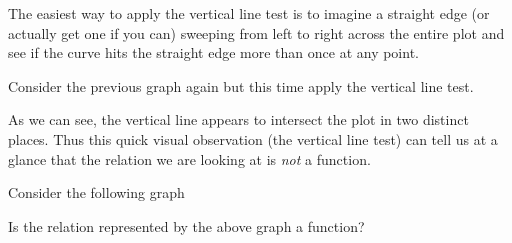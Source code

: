 \documentclass{ximera}
\begin{document}
The easiest way to apply the vertical line test is to imagine a straight edge (or actually get one if you can) sweeping from left to right across the entire plot and see if the curve hits the straight edge more than once at any point.

Consider the previous graph again but this time apply the vertical line test.

\begin{center}
\end{center}

As we can see, the vertical line appears to intersect the plot in two distinct places. Thus this quick visual observation (the vertical line test) can tell us at a glance that the relation we are looking at is \textit{not} a function.

\begin{problem}
    Consider the following graph
    \begin{center}
    \end{center}
    
    Is the relation represented by the above graph a function?
    \begin{multipleChoice}
    \end{multipleChoice}
\end{problem}
\end{document}
